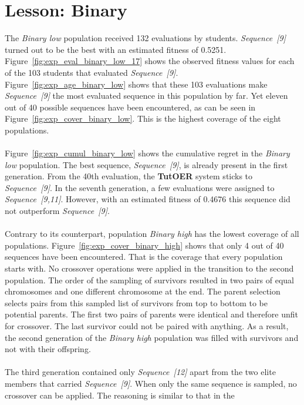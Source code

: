 \section{Lesson: Binary}
\label{sec:results_binary}
The \emph{Binary low} population received 132 evaluations by students.
\emph{Sequence~[9]} turned out to be the best with an estimated fitness of
0.5251. Figure~\ref{fig:exp_eval_binary_low_17} shows the observed fitness
values for each of the 103 students that evaluated \emph{Sequence~[9]}.
Figure~\ref{fig:exp_age_binary_low} shows that these 103 evaluations make
\emph{Sequence~[9]} the most evaluated sequence in this population by far. Yet
eleven out of 40 possible sequences have been encountered, as can be seen in
Figure~\ref{fig:exp_cover_binary_low}. This is the highest coverage of the
eight populations.\\\\
\noindent
Figure~\ref{fig:exp_cumul_binary_low} shows the cumulative regret in the
\emph{Binary low} population. The best sequence, \emph{Sequence~[9]}, is
already present in the first generation. From the 40th evaluation, the \textbf{TutOER}
system sticks to \emph{Sequence~[9]}. In the seventh generation, a few
evaluations were assigned to \emph{Sequence~[9,11]}. However, with an estimated
fitness of 0.4676 this sequence did not outperform \emph{Sequence~[9]}.\\\\
\noindent
Contrary to its counterpart, population \emph{Binary high} has the lowest
coverage of all populations. Figure~\ref{fig:exp_cover_binary_high} shows that
only 4 out of 40 sequences have been encountered. That is the coverage
that every population starts with. No crossover operations were applied in the
transition to the second population. The order of the sampling of survivors
resulted in two pairs of equal chromosomes and one different chromosome at the
end. The parent selection selects pairs from this sampled list of survivors
from top to bottom to be potential parents. The first two pairs of
parents were identical and therefore unfit for crossover. The last survivor
could not be paired with anything. As a result, the second generation of the
\emph{Binary high} population was filled with survivors and not with their
offspring.\\\\
\noindent
The third generation contained only \emph{Sequence~[12]} apart from the two
elite members that carried \emph{Sequence~[9]}. When only the same sequence is
sampled, no crossover can be applied. The reasoning is similar to that in the
